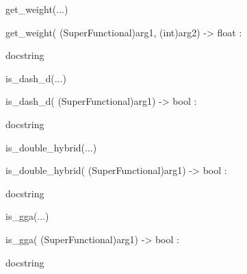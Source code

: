 \documentclass[letterpaper,10pt,english]{sphinxmanual}
\begin{document}
\begin{description}
\begin{description}
\begin{DUlineblock}{0em}
\begin{DUlineblock}{\DUlineblockindent}
\begin{DUlineblock}{\DUlineblockindent}
\item[] 
\end{DUlineblock}
\end{DUlineblock}
\item[] get\_weight(...)
\item[]
\begin{DUlineblock}{\DUlineblockindent}
\item[] get\_weight( (SuperFunctional)arg1, (int)arg2) -\textgreater{} float :
\item[]
\begin{DUlineblock}{\DUlineblockindent}
\item[] docstring
\item[] 
\end{DUlineblock}
\end{DUlineblock}
\item[] is\_dash\_d(...)
\item[]
\begin{DUlineblock}{\DUlineblockindent}
\item[] is\_dash\_d( (SuperFunctional)arg1) -\textgreater{} bool :
\item[]
\begin{DUlineblock}{\DUlineblockindent}
\item[] docstring
\item[] 
\end{DUlineblock}
\end{DUlineblock}
\item[] is\_double\_hybrid(...)
\item[]
\begin{DUlineblock}{\DUlineblockindent}
\item[] is\_double\_hybrid( (SuperFunctional)arg1) -\textgreater{} bool :
\item[]
\begin{DUlineblock}{\DUlineblockindent}
\item[] docstring
\item[] 
\end{DUlineblock}
\end{DUlineblock}
\item[] is\_gga(...)
\item[]
\begin{DUlineblock}{\DUlineblockindent}
\item[] is\_gga( (SuperFunctional)arg1) -\textgreater{} bool :
\item[]
\begin{DUlineblock}{\DUlineblockindent}
\item[] docstring

\end{DUlineblock}
\end{DUlineblock}
\end{DUlineblock}
\end{description}
\end{description}
\end{document}
